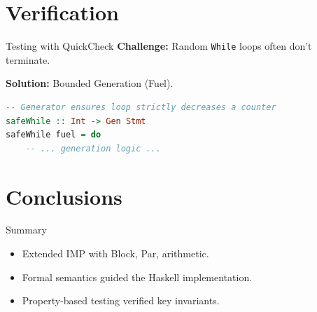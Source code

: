 \documentclass{beamer}
\begin{document}
	\section{Verification}
	\begin{frame}[fragile]{Testing with QuickCheck}
		\textbf{Challenge:} Random \texttt{While} loops often don't terminate.
		
		\textbf{Solution:} Bounded Generation (Fuel).
\begin{lstlisting}[language=Haskell]
-- Generator ensures loop strictly decreases a counter
safeWhile :: Int -> Gen Stmt
safeWhile fuel = do
    -- ... generation logic ...
\end{lstlisting}
	\end{frame}

	\section{Conclusions}
	\begin{frame}{Summary}
		\begin{itemize}
			\item Extended IMP with Block, Par, arithmetic.
			\item Formal semantics guided the Haskell implementation.
			\item Property-based testing verified key invariants.
		\end{itemize}
	\end{frame}
	
\end{document}
